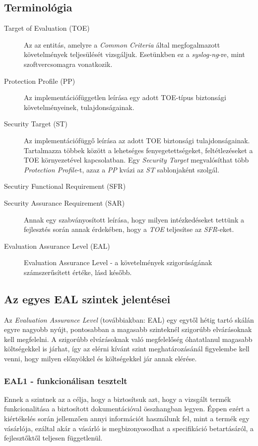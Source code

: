 \subsection{Terminológia}

\begin{description}
    \item[Target of Evaluation (TOE)] {Az az entitás, amelyre a \emph{Common Criteria} által
        megfogalmazott követelmények teljesülését vizsgáljuk. Esetünkben ez a \emph{syslog-ng}-re,
        mint szoftvercsomagra vonatkozik.}
    \item[Protection Profile (PP)] { Az implementációfüggetlen leírása egy adott TOE-típus
        biztonsági követelményeinek, tulajdonságainak. }
    \item[Security Target (ST)] { Az implementációfüggő leírása az adott TOE biztonsági
        tulajdonságainak. Tartalmazza többek között a lehetséges fenyegetettségeket, feltétlezéseket
        a TOE környezetével kapcsolatban. Egy \emph{Security Target} megvalósíthat több
        \emph{Protection Profile}-t, azaz a \emph{PP} kvázi az \emph{ST} sablonjaként szolgál. }
    \item[Secutiry Functional Requirement (SFR)] { }
    \item[Security Assurance Requirement (SAR)] { Annak egy szabványosított leírása, hogy milyen
        intézkedéseket tettünk a fejlesztés során annak érdekében, hogy a \emph{TOE} teljesítse az
        \emph{SFR}-eket.}
    \item[Evaluation Assurance Level (EAL)]{Evaluation Assurance Level - a követelmények
        szigorúságának számszerűsített értéke, lásd később.}
\end{description}

\subsection{Az egyes EAL szintek jelentései}

Az \emph{Evaluation Assurance Level} (továbbiakban: EAL) egy egytől hétig tartó skálán egyre nagyobb
nyújt, pontosabban a magasabb szinteknél szigorúbb elvárásoknak kell megfelelni. A szigorúbb
elvárásoknak való megfelelőség óhatatlanul magasabb költségekkel is járhat, így az elérni kívánt
szint meghatározásánál figyelembe kell venni, hogy milyen előnyökkel és költségekkel jár annak
elérése.

\subsubsection{EAL1 - funkcionálisan tesztelt}
Ennek a szintnek az a célja, hogy a biztosítsuk azt, hogy a vizsgált termék funkcionalitása a
biztosított dokumentációval összhangban legyen. Éppen ezért a kiértékelés során jellemzően annyi
információt használunk fel, mint a termék egy vásárlója, ezáltal akár a vásárló is megbizonyosodhat
a specifikáció betartásáról, a fejlesztőktől teljesen függetlenül.

